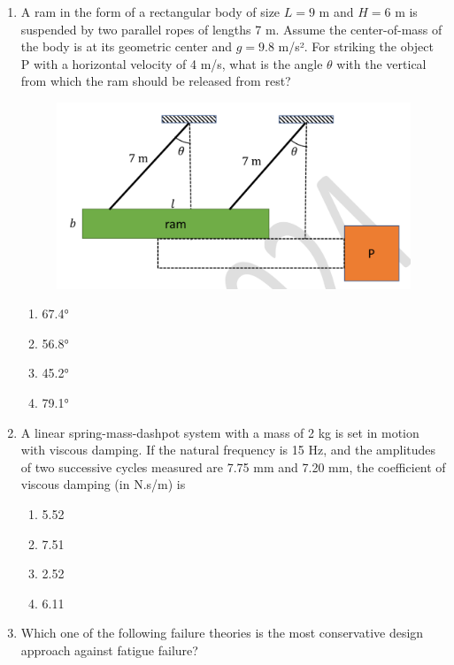 \documentclass[journal,11pt,onecolumn]{IEEEtran}
\begin{document}
\begin{enumerate}[resume]
    \item A ram in the form of a rectangular body of size $L = 9$ m and $H = 6$ m is suspended by two parallel ropes of lengths 7 m. Assume the center-of-mass of the body is at its geometric center and $g = 9.8$ m/s². For striking the object P with a horizontal velocity of 4 m/s, what is the angle $\theta$ with the vertical from which the ram should be released from rest?
          \begin{figure}[H]
              \centering
              \includegraphics[scale=0.2]{q24}
              \caption{}
              \label{fig:q24}
          \end{figure}
          \begin{enumerate}
              \item 67.4°
              \item 56.8°
              \item 45.2°
              \item 79.1°
          \end{enumerate}

    \item A linear spring-mass-dashpot system with a mass of 2 kg is set in motion with viscous damping. If the natural frequency is 15 Hz, and the amplitudes of two successive cycles measured are 7.75 mm and 7.20 mm, the coefficient of viscous damping (in N.s/m) is

          \begin{enumerate}
              \item 5.52
              \item 7.51
              \item 2.52
              \item 6.11
          \end{enumerate}

    \item Which one of the following failure theories is the most conservative design approach against fatigue failure?


\end{enumerate}
\end{document}

